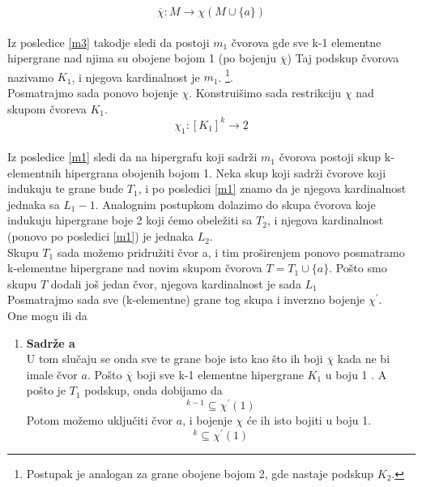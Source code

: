 \documentclass[a4paper]{article}
\begin{document}
\begin{description}
		\begin{equation}
			\overline{\chi}:M \rightarrow \chi (M \cup \{a\})
		\end{equation}
		\\
		Iz posledice \ref{m3} takodje sledi da postoji $m_1$ čvorova gde sve k-1 elementne hipergrane nad njima su obojene bojom 1 (po bojenju $\overline{\chi}$)
		Taj podskup čvorova nazivamo $K_1$, i njegova kardinalnost je  $m_1$. \footnote{Postupak je analogan za grane obojene bojom 2, gde nastaje podskup $K_2$.}. \\
		Posmatrajmo sada ponovo bojenje $\chi$. Konstruišimo sada restrikciju $\chi$ nad  skupom čvoreva $K_1$.
		\begin{equation}
			\chi_1 : [ K_1 ]^k  \rightarrow \underline{2}
		\end{equation}\\
		Iz posledice \ref{m1} sledi da na hipergrafu koji sadrži $m_1$ čvorova postoji skup k-elementnih hipergrana obojenih bojom 1. Neka skup koji sadrži čvorove koji indukuju te grane bude $T_1$, i po posledici \ref{m1} znamo da je njegova kardinalnost jednaka sa $L_1 - 1$. Analognim postupkom dolazimo do  skupa čvorova koje indukuju hipergrane boje 2 koji ćemo obeležiti sa $T_2$, i njegova kardinalnost (ponovo po posledici \ref{m1}) je jednaka $L_2$. \\
		Skupu $T_1$ sada možemo pridružiti čvor a, i tim proširenjem ponovo posmatramo k-elementne hipergrane nad novim skupom čvorova $T = T_1 \cup \{a\}$. Pošto smo skupu $T$ dodali još jedan čvor, njegova kardinalnost je sada $L_1$\\
		Posmatrajmo sada sve (k-elementne) grane tog skupa i inverzno bojenje $\chi^\prime$.\\
		One mogu ili da 
		\begin{enumerate}
			\item \textbf{Sadrže a}\\
				U tom slučaju se onda sve te grane boje isto kao što ih boji $\overline{\chi}$ kada ne bi imale čvor $a$. Pošto $\overline{\chi}$ boji sve k-1 elementne hipergrane $K_1$ u boju 1 . A pošto je $T_1$ podskup, onda dobijamo da 
				\begin{equation}
					[ T_1 ]^{k-1} \subseteq \chi^\prime (1)
				\end{equation}
				Potom možemo uključiti čvor $a$, i bojenje $\chi$ će ih isto bojiti u boju 1.
				\begin{equation}
					[ T_1 \cup \{a\} ]^{k} \subseteq \chi^\prime (1)
				\end{equation}

\end{enumerate}
\end{description}
\end{document}
